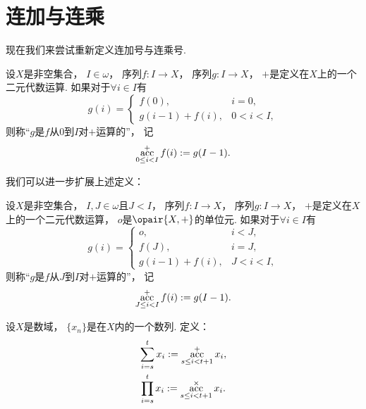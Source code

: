 \section{连加与连乘}
现在我们来尝试重新定义连加号与连乘号.

\begin{definition}
设\(X\)是非空集合，
\(I\in\omega\)，
序列\(f\colon I \to X\)，
序列\(g\colon I \to X\)，
\(+\)是定义在\(X\)上的一个二元代数运算.
如果对于\(\forall i\in I\)有\begin{equation*}
	g(i) = \left\{ \begin{array}{lc}
		f(0), & i=0, \\
		g(i-1) + f(i), & 0<i<I,
	\end{array} \right.
\end{equation*}
则称“\(g\)是\(f\)从\(0\)到\(I\)对\(+\)运算的”，
记\begin{equation*}
	\operatorname*{acc}_{0 \leq i < I}^+ f(i)
	:=
	g(I-1).
\end{equation*}
\end{definition}

我们可以进一步扩展上述定义：
\begin{definition}
设\(X\)是非空集合，
\(I,J\in\omega\)且\(J<I\)，
序列\(f\colon I \to X\)，
序列\(g\colon I \to X\)，
\(+\)是定义在\(X\)上的一个二元代数运算，
\(o\)是\(\opair{X,+}\)的单位元.
如果对于\(\forall i\in I\)有\begin{equation*}
	g(i) = \left\{ \begin{array}{lc}
		o, & i<J, \\
		f(J), & i=J, \\
		g(i-1) + f(i), & J<i<I,
	\end{array} \right.
\end{equation*}
则称“\(g\)是\(f\)从\(J\)到\(I\)对\(+\)运算的”，
记\begin{equation*}
	\operatorname*{acc}_{J \leq i < I}^+ f(i)
	:=
	g(I-1).
\end{equation*}
\end{definition}

\begin{definition}
设\(X\)是数域，
\(\{x_n\}\)是在\(X\)内的一个数列.
定义：\begin{gather*}
	\sum_{i=s}^t x_i
	:=
	\operatorname*{acc}_{s \leq i < t+1}^+ x_i, \\
	\prod_{i=s}^t x_i
	:=
	\operatorname*{acc}_{s \leq i < t+1}^\times x_i.
\end{gather*}
\end{definition}
